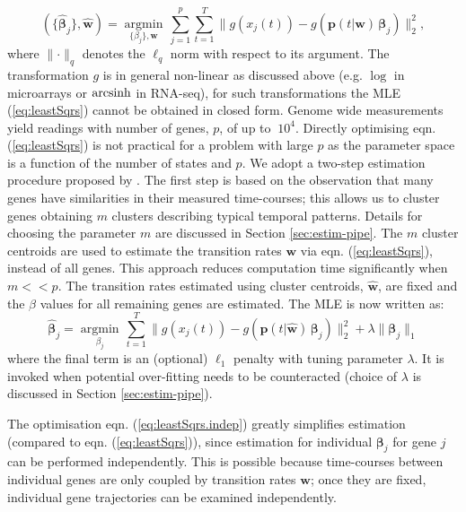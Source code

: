 \begin{equation}
  \label{eq:leastSqrs}
  (\lbrace\hat{\boldsymbol\beta}_j\rbrace, \hat{\mathbf{w}}) =  \underset{\lbrace\beta_j\rbrace, \mathbf{w}}{\operatorname{argmin}} \, \sum_{j=1}^p \sum_{t=1}^T \lVert g(x_j(t)) - g\left(\mathbf{p}(t| \mathbf{w})\,\boldsymbol\beta_j \right) \rVert_2^2,%
\end{equation}
where $\lVert \cdot \rVert_q$ denotes the $\ell_q$ norm with respect to its argument.
The transformation $g$ is in general non-linear as discussed above (e.g. $\log$ in microarrays or $\operatorname{arcsinh}$ in RNA-seq), for such transformations the MLE (\ref{eq:leastSqrs}) cannot be obtained in closed form. Genome wide measurements yield readings with number of genes, $p$, of up to $~10^4$. Directly optimising eqn. (\ref{eq:leastSqrs}) is not practical for a problem with large $p$ as the parameter space is a function of the number of states and $p$. We adopt a two-step estimation procedure proposed by \cite{Armond:2013}. The first step is based on the observation that many genes have similarities in their measured time-courses; this allows us to cluster genes obtaining $m$ clusters describing typical temporal patterns. Details for choosing the parameter $m$ are discussed in Section \ref{sec:estim-pipe}. The $m$ cluster centroids are used to estimate the transition rates $\mathbf{w}$ via eqn. (\ref{eq:leastSqrs}), instead of all genes. This approach reduces computation time significantly when $m << p$.
The transition rates estimated using cluster centroids, $\hat{\mathbf{w}}$, are fixed and the $\beta$ values for all remaining genes are estimated. The MLE is now written as:
\begin{equation}
  \label{eq:leastSqrs.indep}
\hat{\boldsymbol\beta}_j  =  \underset{\beta_j}{\operatorname{argmin}} \, \sum_{t=1}^T \lVert g(x_j(t)) - g\left(\mathbf{p}(t| \hat{\mathbf{w}})\,\boldsymbol\beta_j \right) \rVert_2^2 + \lambda \lVert \boldsymbol\beta_j \rVert_1
\end{equation}
where the final term is an (optional) $\ell_1$ penalty with tuning parameter $\lambda$. It is invoked when potential over-fitting needs to be counteracted (choice of $\lambda$ is discussed in Section \ref{sec:estim-pipe}).

The optimisation eqn. (\ref{eq:leastSqrs.indep}) greatly simplifies estimation (compared to  eqn. (\ref{eq:leastSqrs})), since estimation for individual $\boldsymbol\beta_j$ for gene $j$ can be performed independently. This is possible because time-courses between individual genes are only coupled by transition rates $\mathbf{w}$; once they are fixed, individual gene trajectories can be examined independently.

